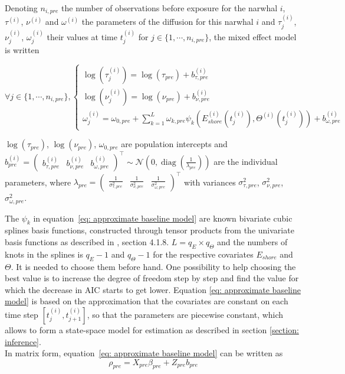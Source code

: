 \documentclass[11pt]{article}
\DeclareMathOperator{\diag}{diag}
\newcommand {\1}{\mathbb{1}}
\begin{document}
Denoting $n_{i,pre}$ the number of observations before exposure for the narwhal $i$, $\tau^{(i)}$, $\nu^{(i)}$  and $\omega^{(i)}$ the parameters of the diffusion for this narwhal $i$ and  $\tau^{(i)}_j$, $\nu_j^{(i)}$, $\omega_j^{(i)}$ their values at time $t_j^{(i)}$ for $j \in \{1, \cdots,n_{i,pre}\}$,  the mixed effect model is written



\begin{equation} 
	\forall j \in \{1,\cdots, n_{i,pre}\},
	\left\{
	\begin{array}{l}
		
		\log(\tau^{(i)}_j)=\log(\tau_{pre})+b_{\tau,pre}^{(i)} \\
		\log(\nu^{(i)}_j)=\log(\nu_{pre})+b_{\nu,pre}^{(i)}  \\
		\omega^{(i)}_j=\omega_{0,pre}+\sum_{k=1}^{L} \omega_{k,pre} \psi_k(E_{shore}^{(i)}(t_j^{(i)}),\Theta^{(i)}(t_j^{(i)})) + b_{\omega,pre}^{(i)}
	\end{array}
	\right.
	\label{eq: approximate baseline model}
\end{equation}


$\log(\tau_{pre})$, $\log(\nu_{pre})$, $\omega_{0,pre}$ are population intercepts and $b^{(i)}_{pre}=\begin{pmatrix} b_{\tau,pre}^{(i)} & b_{\nu,pre}^{(i)} & b_{\omega,pre}^{(i)} \end{pmatrix}^\top \sim \mathcal{N}\left( 0, \diag\left(\frac{1}{\lambda_{pre}}\right)\right)$
are the individual parameters, where $\lambda_{pre}=\begin{pmatrix} \frac{1}{\sigma_{\tau,pre}^2} & \frac{1}{\sigma_{\nu,pre}^2} & \frac{1}{\sigma_{\omega,pre}^2} \end{pmatrix}^\top$ with variances $\sigma_{\tau,pre}^2$, $\sigma_{\nu,pre}^2$, $\sigma_{\omega,pre}^2$.

The $\psi_k$ in equation~\ref{eq: approximate baseline model} are  known bivariate cubic splines basis functions, constructed through tensor products from the univariate basis functions as described in \cite{wood_generalized_2017}, section 4.1.8.
$L=q_E \times q_{\Theta}$ and the numbers of knots in the splines is $q_E-1$ and $q_{\Theta}-1$ for the respective covariates $E_{shore}$ and $\Theta$. It is needed to choose them before hand. One possibility to help choosing the best value is to increase the degree of freedom step by step  and find the value for which the decrease in AIC starts to get lower. Equation \ref{eq: approximate baseline model} is based on the approximation that the covariates are constant on each time step $[t_j^{(i)},t_{j+1}^{(i)}]$, so that the parameters are piecewise constant, which allows to form a state-space model for estimation as described in section \ref{section: inference}.\\
In matrix form, equation~\ref{eq: approximate baseline model} can be written as
\begin{equation}
	\rho_{pre}= X_{pre} \beta_{pre}
	+Z_{pre}b_{pre}
\end{equation}
\end{document}
